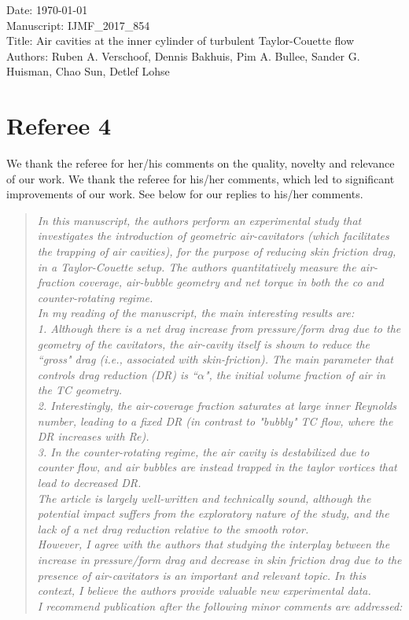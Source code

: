 \documentclass[10pt]{article}
\newcommand{\question}[1]{\begin{quote} \emph{#1}  \end{quote} }
\begin{document}
\noindent Date: \today \\
Manuscript: IJMF\_2017\_854\\
Title: Air cavities at the inner cylinder of turbulent Taylor-Couette flow \\
Authors: Ruben A. Verschoof, Dennis Bakhuis, Pim A. Bullee, Sander G. Huisman, Chao Sun, Detlef Lohse

\vspace*{1.25cm}
\section*{Referee 4}
We thank the referee for her/his comments on the quality, novelty and relevance of our work. We thank the referee for his/her comments, which led to significant improvements of our work. See below for our replies to his/her comments.

\question{In this manuscript, the authors perform an experimental study that investigates the introduction of geometric air-cavitators (which facilitates the trapping of air cavities), for the purpose of reducing skin friction drag, in a Taylor-Couette setup. The authors quantitatively measure the air-fraction coverage, air-bubble geometry and net torque in both the co and counter-rotating regime. \vspace{\baselineskip}\\
In my reading of the manuscript, the main interesting results are: \vspace{\baselineskip}\\ 
1. Although there is a net drag increase from pressure/form drag due to the geometry of the cavitators, the air-cavity itself is shown to reduce the ``gross" drag (i.e., associated with skin-friction). The main parameter that controls drag reduction (DR) is ``$\alpha$", the initial volume fraction of air in the TC geometry.\\
2. Interestingly, the air-coverage fraction saturates at large inner Reynolds number, leading to a fixed DR (in contrast to "bubbly" TC flow, where the DR increases with Re).\\
3. In the counter-rotating regime, the air cavity is destabilized due to counter flow, and air bubbles are instead trapped in the taylor vortices that lead to decreased DR.\vspace{\baselineskip}\\
The article is largely well-written and technically sound, although the potential impact suffers from the exploratory nature of the study, and the lack of a net drag reduction relative to the smooth rotor.\vspace{\baselineskip}\\
However, I agree with the authors that studying the interplay between the increase in pressure/form drag and decrease in skin friction drag due to the presence of air-cavitators is an important and relevant topic. In this context, I believe the authors provide valuable new experimental data. \vspace{\baselineskip}\\
I recommend publication after the following minor comments are addressed:}
\end{document}
